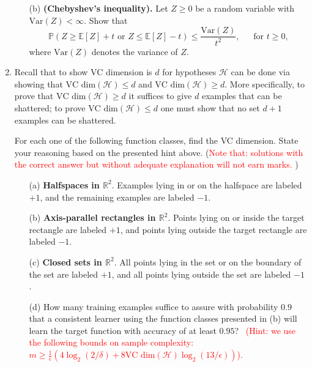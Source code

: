 \documentclass[10pt]{article}
\begin{document}
\begin{enumerate}[1.]
\begin{itemize}
				\item[(b)] \textbf{(Chebyshev’s inequality).} Let $Z \geq 0$ be a random variable with $\textrm{Var}(Z) < \infty$. Show that 
					\begin{equation}
						\mathbb{P}(Z \geq \mathbb{E}[Z] + t \textrm{~or~} Z\leq \mathbb{E}[Z] - t) \leq \frac{\textrm{Var}(Z)}{t^{2}},~\quad\textrm{~for~} t\geq 0,
					\end{equation}
				where  $\textrm{Var}(Z)$ denotes the variance of $Z$.~
			\end{itemize}
		
		\item  Recall that to show VC dimension is $d$ for hypotheses $\mathcal{H}$ can be done via showing that $\textrm{VC~dim}(\mathcal{H}) \leq d$ and $\textrm{VC~dim}(\mathcal{H}) \geq d$. More specifically, to prove that $\textrm{VC~dim}(\mathcal{H}) \geq d$ it suffices to give $d$ examples that can be shattered; to prove $\textrm{VC~dim}(\mathcal{H}) \leq d$ one must show that no set $d+1$ examples can be shattered.
		
		For each one of the following function classes, find the VC dimension. State your reasoning based on the presented hint above. (\textcolor{red}{Note that: solutions with the correct answer but without adequate explanation will not earn marks.} )
		\begin{itemize}		
			\item[(a)]  \textbf{Halfspaces in $\mathbb{R}^{2}$}. Examples lying in or on the halfspace are labeled $+1$, and the remaining examples are labeled $-1$.~
			
			\item[(b)] \textbf{Axis-parallel rectangles in $\mathbb{R}^2$}. Points lying on or inside the target rectangle are labeled $+1$, and points lying outside the target rectangle are labeled $-1$.~
			
			\item[(c)] \textbf{Closed sets in $\mathbb{R}^2$}. All points lying in the set or on the boundary of the set are labeled $+1$, and all points lying outside the set are labeled $-1$.~
				
			\item[(d)] How many training examples suffice to assure with probability $0.9$ that a consistent learner using the function classes presented in (b) will learn the target function with accuracy of at least $0.95$?~ \textcolor{red}{(Hint: we use the following bounds on sample complexity: $m \geq \tfrac{1}{\epsilon}(4\log_{2}(2/\delta) + 8\textrm{VC~dim}(\mathcal{H})\log_{2}(13/\epsilon))$).}
			
		\end{itemize}

			

		

\end{enumerate}
% 
% 
% 
% 
% 

%
%
\end{document}
